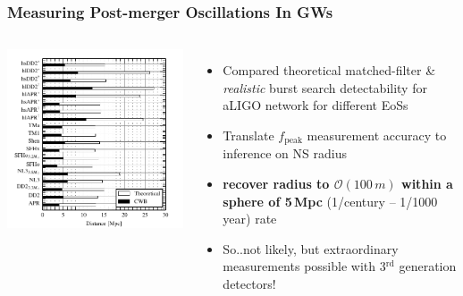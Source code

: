 \documentclass{beamer}
\begin{document}
\begin{frame}
    \frametitle{Measuring Post-merger Oscillations In GWs}
    \begin{columns}[]
        \centering
        \includegraphics[width=\textwidth]{distances.pdf}

    {\small
        \begin{itemize}
            \item Compared theoretical matched-filter \& \emph{realistic} burst
                search detectability for aLIGO network for different EoSs
            \item Translate $f_{\text{peak}}$ measurement accuracy to inference
                on NS radius
            \item {\bf recover radius to $\mathcal{O}(100\,m)$ within a sphere
                of 5\,Mpc} (1/century -- 1/1000 year) rate
            \item So..not likely, but extraordinary measurements possible with
                3$^{\text{rd}}$ generation detectors!
    \end{itemize}}
\end{columns}
\end{frame}
        

\end{document}
